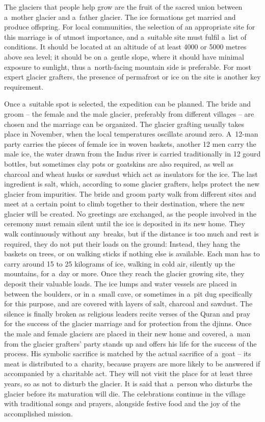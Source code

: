 The glaciers that people help grow are the fruit of the sacred union between a mother glacier and a father
glacier. The ice formations get married and produce offspring. For local communities, the selection of an appropriate site for this marriage is of
utmost importance, and a suitable site must fulfil a list of conditions. It should be located at an altitude of
at least 4000 or 5000 metres above sea level; it should be on a gentle slope, where it should have minimal
exposure to sunlight, thus a north-facing mountain side is preferable. For most expert glacier grafters,
the presence of permafrost or ice on the site is another key requirement. 

Once a suitable spot is selected, the expedition can be planned. The bride and groom – the female and the
male glacier, preferably from different villages – are chosen and the marriage can be organized. The glacier
grafting usually takes place in November, when the local temperatures oscillate around zero. A 12-man party
carries the pieces of female ice in woven baskets, another 12 men carry the male ice, the water drawn from the
Indus river is carried traditionally in 12 gourd bottles, but sometimes clay pots or goatskins are also
required, as well as charcoal and wheat husks or sawdust which act as insulators for the ice. The last
ingredient is salt, which, according to some glacier grafters, helps protect the new glacier from impurities.
The bride and groom party walk from different sites and meet at a certain point to climb together to their destination, where the new glacier will be created. No greetings are exchanged, as the people involved in the ceremony must remain silent until
the ice is deposited in its new home. They walk continuously without any breaks, but if the distance is too
much and rest is required, they do not put their loads on the ground: Instead, they hang the baskets on trees, or
on walking sticks if nothing else is available. Each man has to carry around 15 to 25 kilograms of ice, walking
in cold air, silently up the mountains, for a day or more. Once they reach the glacier growing site, they
deposit their valuable loads. The ice lumps and water vessels are placed in between the boulders, or in a small
cave, or sometimes in a pit dug specifically for this purpose, and are covered with layers of salt, charcoal and sawdust. The silence is
finally broken as religious leaders recite verses of the Quran and pray for the success of the glacier marriage
and for protection from the djinns. Once the male and female glaciers are placed in their new home and covered,
a man from the glacier grafters' party stands up and offers his life for the success of the process. His
symbolic sacrifice is matched by the actual sacrifice of a goat – its meat is distributed to a charity, because
prayers are more likely to be answered if accompanied by a charitable act. They will not visit the place for at
least three years, so as not to disturb the glacier. It is said that a person who disturbs the glacier before
its maturation will die. The celebrations continue in the village with traditional songs and prayers, alongside
festive food and the joy of the accomplished mission.

